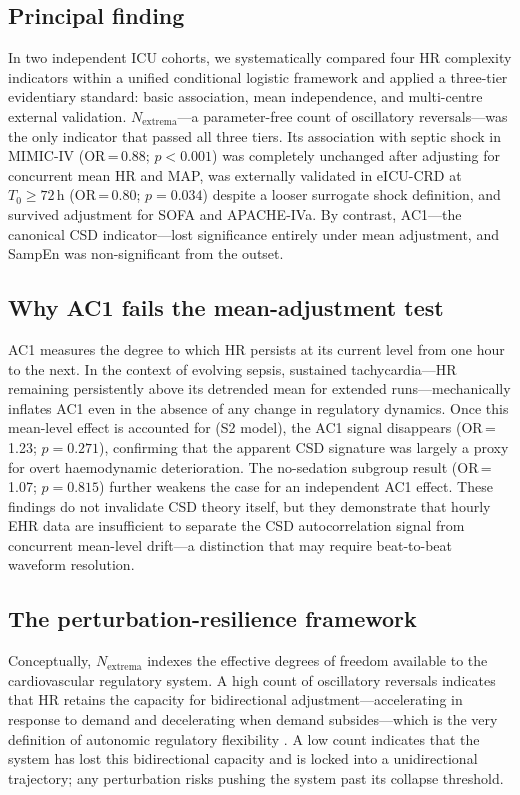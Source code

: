\documentclass[12pt,a4paper]{article}
\begin{document}
\subsection*{Principal finding}

In two independent ICU cohorts, we systematically compared four HR complexity
indicators within a unified conditional logistic framework and applied a
three-tier evidentiary standard: basic association, mean independence, and
multi-centre external validation.
$N_{\text{extrema}}$---a parameter-free count of oscillatory reversals---was
the only indicator that passed all three tiers.
Its association with septic shock in MIMIC-IV (OR\,=\,0.88; $p<0.001$)
was completely unchanged after adjusting for concurrent mean HR and MAP,
was externally validated in eICU-CRD at $T_0\geq72$\,h (OR\,=\,0.80;
$p=0.034$) despite a looser surrogate shock definition,
and survived adjustment for SOFA and APACHE-IVa.
By contrast, AC1---the canonical CSD indicator---lost significance
entirely under mean adjustment, and SampEn was non-significant from the
outset.

\subsection*{Why AC1 fails the mean-adjustment test}

AC1 measures the degree to which HR persists at its current level from
one hour to the next.
In the context of evolving sepsis, sustained tachycardia---HR remaining
persistently above its detrended mean for extended runs---mechanically
inflates AC1 even in the absence of any change in regulatory dynamics.
Once this mean-level effect is accounted for (S2 model), the AC1 signal
disappears (OR\,=\,1.23; $p=0.271$), confirming that the apparent CSD
signature was largely a proxy for overt haemodynamic deterioration.
The no-sedation subgroup result (OR\,=\,1.07; $p=0.815$) further weakens
the case for an independent AC1 effect.
These findings do not invalidate CSD theory itself, but they demonstrate
that hourly EHR data are insufficient to separate the CSD autocorrelation
signal from concurrent mean-level drift---a distinction that may require
beat-to-beat waveform resolution.

\subsection*{The perturbation-resilience framework}

Conceptually, $N_{\text{extrema}}$ indexes the effective degrees of freedom
available to the cardiovascular regulatory system.
A high count of oscillatory reversals indicates that HR retains the capacity
for bidirectional adjustment---accelerating in response to demand and
decelerating when demand subsides---which is the very definition of
autonomic regulatory flexibility \citep{decastilho2018,carrara2021}.
A low count indicates that the system has lost this bidirectional capacity
and is locked into a unidirectional trajectory; any perturbation risks
pushing the system past its collapse threshold.
\end{document}
